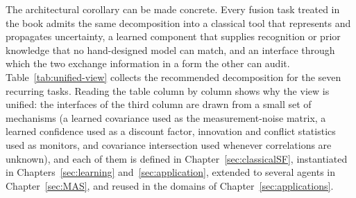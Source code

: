 \documentclass[graybox,envcountchap]{style/SNmono}
\begin{document}
The architectural corollary can be made concrete. Every fusion task treated in the book admits the same decomposition into a classical tool that represents and propagates uncertainty, a learned component that supplies recognition or prior knowledge that no hand-designed model can match, and an interface through which the two exchange information in a form the other can audit. Table~\ref{tab:unified-view} collects the recommended decomposition for the seven recurring tasks. Reading the table column by column shows why the view is unified: the interfaces of the third column are drawn from a small set of mechanisms (a learned covariance used as the measurement-noise matrix, a learned confidence used as a discount factor, innovation and conflict statistics used as monitors, and covariance intersection used whenever correlations are unknown), and each of them is defined in Chapter~\ref{sec:classicalSF}, instantiated in Chapters~\ref{sec:learning} and~\ref{sec:application}, extended to several agents in Chapter~\ref{sec:MAS}, and reused in the domains of Chapter~\ref{sec:applications}.
\end{document}
